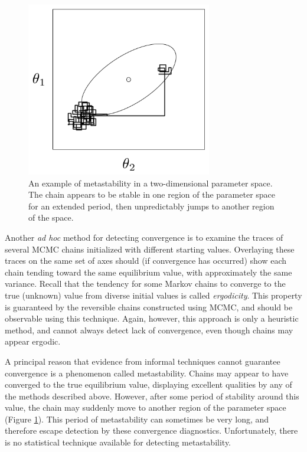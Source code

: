 \begin{figure}[h]
\begin{center}
\includegraphics[height=3in]{metastable.png}
\caption{An example of metastability in a two-dimensional parameter space. The chain appears to be stable in one region of the parameter space for an extended period, then unpredictably jumps to another region of the space.}
\label{fig:metas}
\end{center}
\end{figure}

Another \emph{ad hoc} method for detecting convergence is to examine the traces of several MCMC chains initialized with different starting values. Overlaying these traces on the same set of axes should (if convergence has occurred) show each chain tending toward the same equilibrium value, with approximately the same variance. Recall that the tendency for some Markov chains to converge to the true (unknown) value from diverse initial values is called \emph{ergodicity}. This property is guaranteed by the reversible chains constructed using MCMC, and should be observable using this technique. Again, however, this approach is only a heuristic method, and cannot always detect lack of convergence, even though chains may appear ergodic.

A principal reason that evidence from informal techniques cannot guarantee convergence is a phenomenon called metastability. Chains may appear to have converged to the true equilibrium value, displaying excellent qualities by any of the methods described above. However, after some period of stability around this value, the chain may suddenly move to another region of the parameter space (Figure \ref{fig:metas}). This period of metastability can sometimes be very long, and therefore escape detection by these convergence diagnostics. Unfortunately, there is no statistical technique available for detecting metastability.

